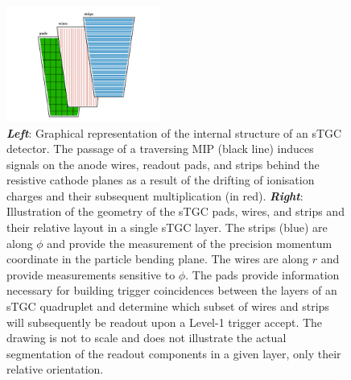 \begin{figure}[!htb]
    \begin{center}
        \includegraphics[width=0.45\textwidth]{figures/nsw/stgc_layer_cartoonPDF}
        \caption{
            \textbf{\textit{Left}}: Graphical representation of the internal structure of an
                sTGC detector.
                The passage of a traversing MIP (black line) induces signals on the anode wires, readout pads,
                and strips behind the resistive cathode planes as a result of the drifting of ionisation
                charges and their subsequent multiplication (in red).
            \textbf{\textit{Right}}: Illustration of the geometry of the sTGC pads, wires, and strips and their
                relative layout in a single sTGC layer.
                The strips (blue) are along $\phi$ and provide the measurement of the precision momentum coordinate
                in the particle bending plane.
                The wires are along $r$ and provide measurements sensitive to $\phi$.
                The pads provide information necessary for building trigger coincidences between
                the layers of an sTGC quadruplet and determine which subset of wires and strips will
                subsequently be readout upon a Level-1 trigger accept.
                The drawing is not to scale and does not illustrate the actual segmentation
                of the readout components in a given layer, only their relative orientation.
        }
        \label{fig:stgc_drawing}
    \end{center}
\end{figure}
